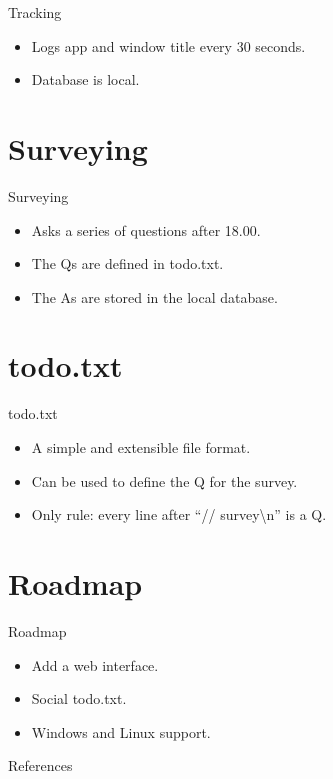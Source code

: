 \documentclass[aspectratio=32]{beamer}
\providecommand{\tightlist}{\setlength{\itemsep}{0pt}\setlength{\parskip}{0pt}}
\begin{document}
  \begin{frame}[allowframebreaks]{\textbar{} Tracking}
  \begin{itemize}
  \tightlist
  \item
    Logs app and window title every 30 seconds.
  \item
    Database is local.
  \end{itemize}
  \end{frame}

  \section{\textbar{} Surveying}\label{surveying}

  \begin{frame}[allowframebreaks]{\textbar{} Surveying}
  \begin{itemize}
  \tightlist
  \item
    Asks a series of questions after 18.00.
  \item
    The Qs are defined in todo.txt.
  \item
    The As are stored in the local database.
  \end{itemize}
  \end{frame}

  \section{\textbar{} todo.txt}\label{todo.txt}

  \begin{frame}[allowframebreaks]{\textbar{} todo.txt}
  \begin{itemize}
  \tightlist
  \item
    A simple and extensible file format.
  \item
    Can be used to define the Q for the survey.
  \item
    Only rule: every line after ``// survey\textbackslash n'' is a Q.
  \end{itemize}
  \end{frame}

  \section{\textbar{} Roadmap}\label{roadmap}

  \begin{frame}[allowframebreaks]{\textbar{} Roadmap}
  \begin{itemize}
  \tightlist
  \item
    Add a web interface.
  \item
    Social todo.txt.
  \item
    Windows and Linux support.
  \end{itemize}
  \end{frame}

  
\begin{frame}[allowframebreaks]
  \Large{References}
  \small\linespread{1.2}\printbibliography
\end{frame}
\end{document}
